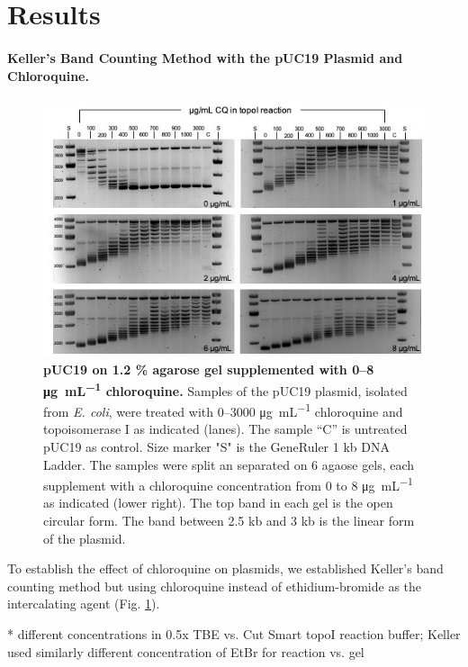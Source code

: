 \documentclass[10pt,letterpaper]{article}
\newcommand{\ugml}{\micro\gram\per\milli\liter}
\begin{document}
\section{Results}

\paragraph{Keller's Band Counting Method with the pUC19 Plasmid and Chloroquine.}

\begin{figure}[ht!]
    \includegraphics[width=\textwidth]{figures/keller_puc19.jpg}
  \caption{\textbf{pUC19 on 1.2 \% agarose gel supplemented with 0--8
      \si{\ugml} chloroquine.} Samples of the pUC19 plasmid, isolated
    from \textit{E. coli}, were treated with 0--3000 \si{\ugml}
    chloroquine and topoisomerase I as indicated (lanes). The sample
    “C” is untreated pUC19 as control. Size marker "S" is the
    GeneRuler 1 kb DNA Ladder. The samples were split an separated on
    6 agaose gels, each supplement with a chloroquine concentration
    from 0 to 8 \si{\ugml} as indicated (lower right). The top band
    in each gel is the open circular form. The band between  2.5 kb and 3 kb
    is the linear form of the plasmid.}
  \label{fig:keller} 
\end{figure}

To establish the effect of chloroquine on plasmids, we established
Keller's band counting method \cite{Keller1975b} but using chloroquine
instead of ethidium-bromide as the intercalating agent
(Fig. \ref{fig:keller}).

* different concentrations in 0.5x TBE vs. Cut Smart topoI reaction
buffer; Keller used similarly different concentration of EtBr for
reaction vs. gel
\end{document}
